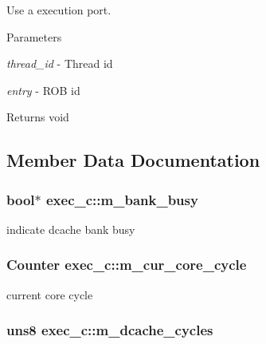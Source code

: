 Use a execution port. 


\begin{DoxyParams}{Parameters}
\item[{\em thread\_\-id}]-\/ Thread id \item[{\em entry}]-\/ ROB id \end{DoxyParams}
\begin{DoxyReturn}{Returns}
void 
\end{DoxyReturn}


\subsection{Member Data Documentation}
\hypertarget{classexec__c_ade46e31187315f10d8d9352a95af6fbc}{
\subsubsection[{m\_\-bank\_\-busy}]{\setlength{\rightskip}{0pt plus 5cm}bool$\ast$ {\bf exec\_\-c::m\_\-bank\_\-busy}}}
\label{classexec__c_ade46e31187315f10d8d9352a95af6fbc}
indicate dcache bank busy \hypertarget{classexec__c_a7c73b7c74d2097b190adb8dd84582116}{
\subsubsection[{m\_\-cur\_\-core\_\-cycle}]{\setlength{\rightskip}{0pt plus 5cm}Counter {\bf exec\_\-c::m\_\-cur\_\-core\_\-cycle}}}
\label{classexec__c_a7c73b7c74d2097b190adb8dd84582116}
current core cycle \hypertarget{classexec__c_a3f279061192ac53468378460f26ced72}{
\subsubsection[{m\_\-dcache\_\-cycles}]{\setlength{\rightskip}{0pt plus 5cm}uns8 {\bf exec\_\-c::m\_\-dcache\_\-cycles}}}
